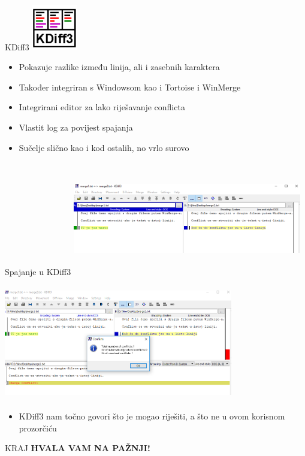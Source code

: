\documentclass[10pt]{beamer}
\begin{document}
\begin{frame}{KDiff3}
    \includegraphics[width=2cm, height=2cm]{kdiff1.png}
    \begin{itemize}
        \item Pokazuje razlike između linija, ali i zasebnih karaktera
        \item Također integriran s Windowsom kao i Tortoise i WinMerge
        \item Integrirani editor za lako riješavanje conflicta
        \item Vlastit log za povijest spajanja
        \item Sučelje slično kao i kod ostalih, no vrlo surovo
    \end{itemize}
\end{frame}
\begin{frame}{Spajanje u KDiff3}
    \includegraphics[width=10cm, height=5cm]{kdiff2.png}
    
\end{frame}
    \begin{frame}
    \includegraphics[width=10cm, height=5cm]{kdiff3.png}
    \begin{itemize}
        \item KDiff3 nam točno govori što je mogao riješiti, a što ne u ovom korisnom prozorčiću
    \end{itemize}
    
\end{frame}

\begin{frame}{KRAJ}
\textbf{HVALA VAM NA PAŽNJI!}
\end{frame}
\end{document}
